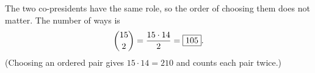 The two co-presidents have the same role, so the order of choosing them does not matter. The number of ways is
\[
\dbinom{15}{2}=\dfrac{15\cdot14}{2}=\boxed{105}.
\]
(Choosing an ordered pair gives $15\cdot14=210$ and counts each pair twice.)
